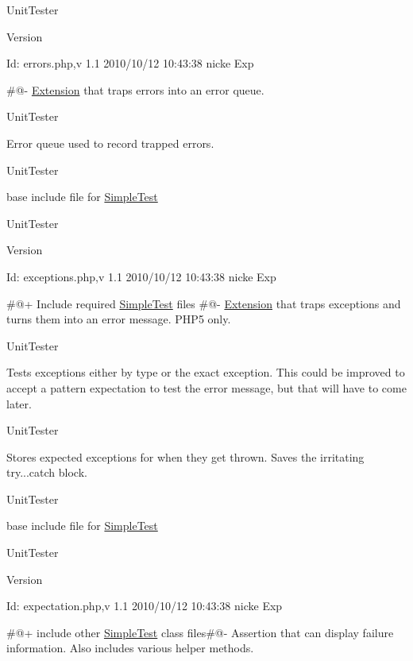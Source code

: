 UnitTester \begin{DoxyVersion}{Version}

\end{DoxyVersion}
\begin{DoxyParagraph}{Id:}
errors.php,v 1.1 2010/10/12 10:43:38 nicke Exp 
\end{DoxyParagraph}


\#@-\/ \hyperlink{class_extension}{Extension} that traps errors into an error queue.

UnitTester

Error queue used to record trapped errors.

UnitTester

base include file for \hyperlink{class_simple_test}{SimpleTest}

UnitTester \begin{DoxyVersion}{Version}

\end{DoxyVersion}
\begin{DoxyParagraph}{Id:}
exceptions.php,v 1.1 2010/10/12 10:43:38 nicke Exp 
\end{DoxyParagraph}


\#@+ Include required \hyperlink{class_simple_test}{SimpleTest} files \#@-\/ \hyperlink{class_extension}{Extension} that traps exceptions and turns them into an error message. PHP5 only.

UnitTester

Tests exceptions either by type or the exact exception. This could be improved to accept a pattern expectation to test the error message, but that will have to come later.

UnitTester

Stores expected exceptions for when they get thrown. Saves the irritating try...catch block.

UnitTester

base include file for \hyperlink{class_simple_test}{SimpleTest}

UnitTester \begin{DoxyVersion}{Version}

\end{DoxyVersion}
\begin{DoxyParagraph}{Id:}
expectation.php,v 1.1 2010/10/12 10:43:38 nicke Exp 
\end{DoxyParagraph}


\#@+ include other \hyperlink{class_simple_test}{SimpleTest} class files\#@-\/ Assertion that can display failure information. Also includes various helper methods.

